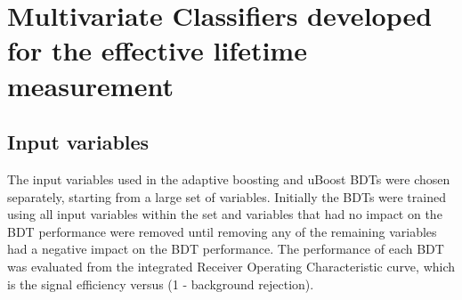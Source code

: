 \chapter{Multivariate Classifiers developed for the effective lifetime measurement}
\label{sec:appendix2}


\section{Input variables}





The input variables used in the adaptive boosting and uBoost BDTs were chosen separately, starting from a large set of variables. %
Initially the BDTs were trained using all input variables within the set and variables that had no impact on the BDT performance were removed until removing any of the remaining variables had a negative impact on the BDT performance. The performance of each BDT was evaluated from the integrated Receiver Operating Characteristic curve, which is the signal efficiency versus (1 - background rejection). %


